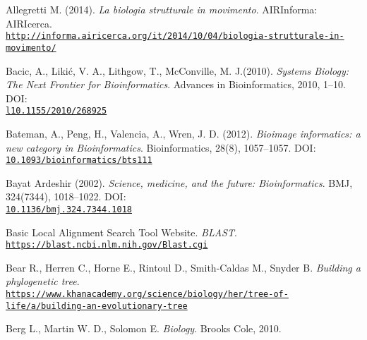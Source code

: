 \documentclass[twoside,openright,titlepage,fleqn,
,	headinclude,12pt,a4paper,BCOR5mm,footinclude,table]{scrbook}
\newcommand{\?}{'\-\nobreak\hspace{0pt}}
\begin{document}
\begin{thebibliography}{60}

Allegretti M. (2014).\newline
\textit{La biologia strutturale in movimento}. \newline
AIRInforma: AIRIcerca.
\\\texttt{\url{http://informa.airicerca.org/it/2014/10/04/biologia-strutturale-in-movimento/}}

Bacic, A., Likić, V. A., Lithgow, T., McConville, M. J.(2010).\newline 
\textit{Systems Biology: The Next Frontier for Bioinformatics}.\newline
Advances in Bioinformatics, 2010, 1–10. \newline
DOI: \\\texttt{\url{l10.1155/2010/268925}}

Bateman, A., Peng, H., Valencia, A., Wren, J. D. (2012).\newline
\textit{Bioimage informatics: a new category in Bioinformatics}. \newline
Bioinformatics, 28(8), 1057–1057. \newline
DOI: \\\texttt{\url{10.1093/bioinformatics/bts111}}

Bayat Ardeshir (2002).\newline
\textit{Science, medicine, and the future: Bioinformatics}.\newline
BMJ, 324(7344), 1018–1022.
DOI: \\\texttt{\url{10.1136/bmj.324.7344.1018}}

Basic Local Alignment Search Tool Website.\newline
\textit{BLAST}.
\\\texttt{\url{https://blast.ncbi.nlm.nih.gov/Blast.cgi}}

Bear R., Herren C., Horne E., Rintoul D., Smith-Caldas M., Snyder B. \newline
\textit{Building a phylogenetic tree}.
\\\texttt{\url{https://www.khanacademy.org/science/biology/her/tree-of-life/a/building-an-evolutionary-tree}}

Berg L., Martin W. D., Solomon E. \newline
\textit{Biology}.\newline
Brooks Cole, 2010.


\end{thebibliography}
\end{document}
